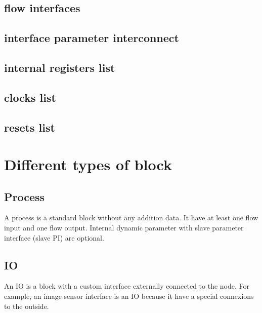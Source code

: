 \subsection{flow interfaces}
\subsection{interface parameter interconnect}
\subsection{internal registers list}
\subsection{clocks list}
\subsection{resets list}


\section{Different types of block}
\subsection{Process}
A process is a standard block without any addition data. It have at least one flow input and one flow output. Internal dynamic parameter with slave parameter interface (slave PI) are optional.

\subsection{IO}
An IO is a block with a custom interface externally connected to the node. For example, an image sensor interface is an IO because it have a special connexions to the outside.
